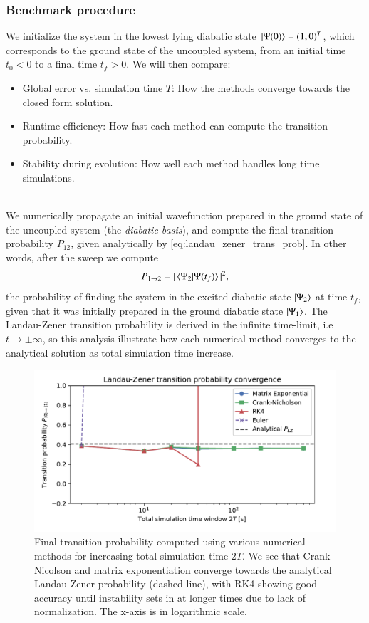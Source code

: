 \documentclass{subfiles}
\begin{document}
\subsubsection*{Benchmark procedure}
We initialize the system in the lowest lying diabatic state $\ket{\Psi(0)} = (1, 0)^T$, which corresponds to the ground state of the uncoupled system, from an initial time $t_0<0$ to a final time $t_f>0$. We will then compare:
\begin{itemize}
    \item Global error vs. simulation time $T$: How the methods converge towards the closed form solution.
    \item Runtime efficiency: How fast each method can compute the transition probability.
    \item Stability during evolution: How well each method handles long time simulations. 
\end{itemize}
\\ 
We numerically propagate an initial wavefunction prepared in the ground state of the uncoupled system (the \emph{diabatic basis}), and compute the final transition probability $P_{12}$, given analytically by \eqref{eq:landau_zener_trans_prob}. In other words, after the sweep we compute 
\begin{align*}
    P_{1\to2} = |\braket{\Psi_2|\Psi(t_f)}|^2,
\end{align*}
the probability of finding the system in the excited diabatic state $\ket{\Psi_2}$ at time $t_f$, given that it was initially prepared in the ground diabatic state $\ket{\Psi_1}$. The Landau-Zener transition probability is derived in the infinite time-limit, i.e $t\rightarrow \pm \infty$, so this analysis illustrate how each numerical method converges to the analytical solution as total simulation time increase.
\begin{figure}[h!]
\centering
\includegraphics[width=1.0\textwidth]{figs/landau_zener_convergence_benchmark.pdf}
\caption{Final transition probability computed using various numerical methods for increasing total simulation time $
2T$. We see that Crank-Nicolson and matrix exponentiation converge towards the analytical Landau-Zener probability (dashed line), with RK4 showing good accuracy until instability sets in at longer times due to lack of normalization. The x-axis is in logarithmic scale.}
\label{fig:landau_zener_convergence_benchmark}
\end{figure}
\end{document}
